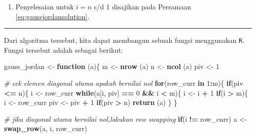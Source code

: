 \documentclass[]{book}
\newenvironment{Shaded}{\begin{snugshade}}{\end{snugshade}}
\newcommand{\CommentTok}[1]{\textcolor[rgb]{0.56,0.35,0.01}{\textit{#1}}}
\newcommand{\ControlFlowTok}[1]{\textcolor[rgb]{0.13,0.29,0.53}{\textbf{#1}}}
\newcommand{\DecValTok}[1]{\textcolor[rgb]{0.00,0.00,0.81}{#1}}
\newcommand{\KeywordTok}[1]{\textcolor[rgb]{0.13,0.29,0.53}{\textbf{#1}}}
\newcommand{\NormalTok}[1]{#1}
\newcommand{\OperatorTok}[1]{\textcolor[rgb]{0.81,0.36,0.00}{\textbf{#1}}}
\newcommand{\StringTok}[1]{\textcolor[rgb]{0.31,0.60,0.02}{#1}}
\providecommand{\tightlist}{%
  \setlength{\itemsep}{0pt}\setlength{\parskip}{0pt}}
\theoremstyle{definition}
\theoremstyle{definition}
\theoremstyle{definition}
\theoremstyle{remark}
\begin{document}
\begin{enumerate}
\def\labelenumi{\arabic{enumi}.}
\setcounter{enumi}{4}
\tightlist
\item
  Penyelesaian untuk \(i=n\) s/d 1 disajikan pada Persamaan \eqref{eq:gaussjordansolution}.
\end{enumerate}

\begin{center}\rule{0.5\linewidth}{\linethickness}\end{center}

Dari algoritma tersebut, kita dapat membangun sebuah fungsi menggunakan \texttt{R}. Fungsi tersebut adalah sebagai berikut:

\begin{Shaded}
\begin{Highlighting}[]
\NormalTok{gauss_jordan <-}\StringTok{ }\ControlFlowTok{function}\NormalTok{ (a)\{}
\NormalTok{    m <-}\StringTok{ }\KeywordTok{nrow}\NormalTok{ (a)}
\NormalTok{    n <-}\StringTok{ }\KeywordTok{ncol}\NormalTok{ (a)}
\NormalTok{    piv <-}\StringTok{ }\DecValTok{1}
    
\CommentTok{# cek elemen diagonal utama apakah bernilai nol}
    \ControlFlowTok{for}\NormalTok{(row_curr }\ControlFlowTok{in} \DecValTok{1}\OperatorTok{:}\NormalTok{m)\{}
        \ControlFlowTok{if}\NormalTok{(piv }\OperatorTok{<=}\StringTok{ }\NormalTok{n)\{}
\NormalTok{            i <-}\StringTok{ }\NormalTok{row_curr}
            \ControlFlowTok{while}\NormalTok{(a[i, piv] }\OperatorTok{==}\StringTok{ }\DecValTok{0} \OperatorTok{&&}\StringTok{ }\NormalTok{i }\OperatorTok{<}\StringTok{ }\NormalTok{m)\{}
\NormalTok{                i <-}\StringTok{ }\NormalTok{i }\OperatorTok{+}\StringTok{ }\DecValTok{1}
                \ControlFlowTok{if}\NormalTok{(i }\OperatorTok{>}\StringTok{ }\NormalTok{m)\{}
\NormalTok{                    i <-}\StringTok{ }\NormalTok{row_curr}
\NormalTok{                    piv <-}\StringTok{ }\NormalTok{piv }\OperatorTok{+}\StringTok{ }\DecValTok{1}
                    \ControlFlowTok{if}\NormalTok{(piv }\OperatorTok{>}\StringTok{ }\NormalTok{n)}
                        \KeywordTok{return}\NormalTok{ (a)}
\NormalTok{                \}}
\NormalTok{            \}}

\CommentTok{# jika diagonal utama bernilai nol,lakukan row swapping}
            \ControlFlowTok{if}\NormalTok{(i }\OperatorTok{!=}\StringTok{ }\NormalTok{row_curr)}
\NormalTok{                a <-}\StringTok{ }\KeywordTok{swap_row}\NormalTok{(a, i, row_curr)}
            

\end{Highlighting}
\end{Shaded}
\end{document}
